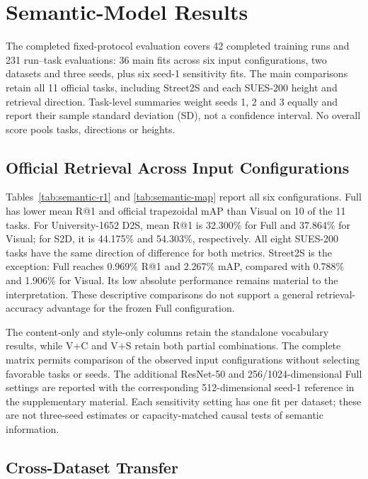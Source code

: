 \section{Semantic-Model Results}
\label{sec:semantic-results}

The completed fixed-protocol evaluation covers 42 completed training runs
and 231 run--task evaluations: 36 main fits across six input configurations,
two datasets and three seeds, plus six seed-1 sensitivity fits. The main
comparisons retain all 11 official tasks, including Street2S and each SUES-200
height and retrieval direction. Task-level summaries weight seeds 1, 2 and 3
equally and report their sample standard deviation (SD), not a confidence
interval. No overall score pools tasks, directions or heights.

\subsection{Official Retrieval Across Input Configurations}

Tables~\ref{tab:semantic-r1} and \ref{tab:semantic-map} report all six
configurations. Full has lower mean R@1 and official trapezoidal mAP than
Visual on 10 of the 11 tasks. For University-1652 D2S, mean R@1 is
32.300\% for Full and 37.864\% for Visual; for S2D, it is 44.175\% and
54.303\%, respectively. All eight SUES-200 tasks have the same direction
of difference for both metrics. Street2S is the exception: Full reaches
0.969\% R@1 and 2.267\% mAP, compared with 0.788\% and 1.906\% for
Visual. Its low absolute performance remains material to the interpretation.
These descriptive comparisons do not support a general retrieval-accuracy
advantage for the frozen Full configuration.




The content-only and style-only columns retain the standalone vocabulary
results, while V+C and V+S retain both partial combinations. The complete
matrix permits comparison of the observed input configurations without
selecting favorable tasks or seeds. The additional ResNet-50 and
256/1024-dimensional Full settings are reported with the corresponding
512-dimensional seed-1 reference in the supplementary material. Each
sensitivity setting has one fit per dataset; these are not three-seed
estimates or capacity-matched causal tests of semantic information.

\subsection{Cross-Dataset Transfer}

